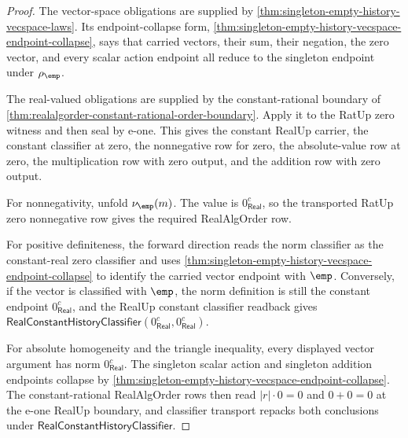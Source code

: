 \begin{proof}
The vector-space obligations are supplied by
\autoref{thm:singleton-empty-history-vecspace-laws}. Its endpoint-collapse
form, \autoref{thm:singleton-empty-history-vecspace-endpoint-collapse}, says
that carried vectors, their sum, their negation, the zero vector, and every
scalar action endpoint all reduce to the singleton endpoint under
$\rho_{\emp}$.

The real-valued obligations are supplied by the constant-rational boundary of
\autoref{thm:realalgorder-constant-rational-order-boundary}. Apply it to the
RatUp zero witness and then seal by e-one. This gives the constant RealUp
carrier, the constant classifier at zero, the nonnegative row for zero, the
absolute-value row at zero, the multiplication row with zero output, and the
addition row with zero output.

For nonnegativity, unfold $\nu_{\emp}(m)$. The value is $0_{\mathsf{Real}}^{c}$, so
the transported RatUp zero nonnegative row gives the required RealAlgOrder
row.

For positive definiteness, the forward direction reads the norm classifier as
the constant-real zero classifier and uses
\autoref{thm:singleton-empty-history-vecspace-endpoint-collapse} to identify
the carried vector endpoint with $\emp$. Conversely, if the vector is
classified with $\emp$, the norm definition is still the constant endpoint
$0_{\mathsf{Real}}^{c}$, and the RealUp constant classifier readback gives
$\mathsf{RealConstantHistoryClassifier}(0_{\mathsf{Real}}^{c},0_{\mathsf{Real}}^{c})$.

For absolute homogeneity and the triangle inequality, every displayed vector
argument has norm $0_{\mathsf{Real}}^{c}$. The singleton scalar action and singleton
addition endpoints collapse by
\autoref{thm:singleton-empty-history-vecspace-endpoint-collapse}. The
constant-rational RealAlgOrder rows then read
$|r|\cdot 0=0$ and $0+0=0$ at the e-one RealUp boundary, and classifier
transport repacks both conclusions under
$\mathsf{RealConstantHistoryClassifier}$.
\end{proof}

